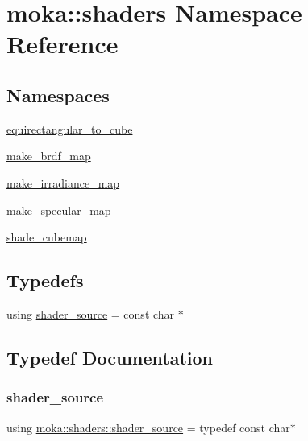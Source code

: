 \hypertarget{namespacemoka_1_1shaders}{}\section{moka\+::shaders Namespace Reference}
\label{namespacemoka_1_1shaders}
\subsection*{Namespaces}
\begin{DoxyCompactItemize}
\item 
 \mbox{\hyperlink{namespacemoka_1_1shaders_1_1equirectangular__to__cube}{equirectangular\+\_\+to\+\_\+cube}}
\item 
 \mbox{\hyperlink{namespacemoka_1_1shaders_1_1make__brdf__map}{make\+\_\+brdf\+\_\+map}}
\item 
 \mbox{\hyperlink{namespacemoka_1_1shaders_1_1make__irradiance__map}{make\+\_\+irradiance\+\_\+map}}
\item 
 \mbox{\hyperlink{namespacemoka_1_1shaders_1_1make__specular__map}{make\+\_\+specular\+\_\+map}}
\item 
 \mbox{\hyperlink{namespacemoka_1_1shaders_1_1shade__cubemap}{shade\+\_\+cubemap}}
\end{DoxyCompactItemize}
\subsection*{Typedefs}
\begin{DoxyCompactItemize}
\item 
using \mbox{\hyperlink{namespacemoka_1_1shaders_a77cb8c8cc9c0c3c844e752f61de532e7}{shader\+\_\+source}} = const char $\ast$
\end{DoxyCompactItemize}


\subsection{Typedef Documentation}
\mbox{\label{namespacemoka_1_1shaders_a77cb8c8cc9c0c3c844e752f61de532e7}} 
\subsubsection{\texorpdfstring{shader\_source}{shader\_source}}
{\footnotesize\ttfamily using \mbox{\hyperlink{namespacemoka_1_1shaders_a77cb8c8cc9c0c3c844e752f61de532e7}{moka\+::shaders\+::shader\+\_\+source}} = typedef const char$\ast$}

